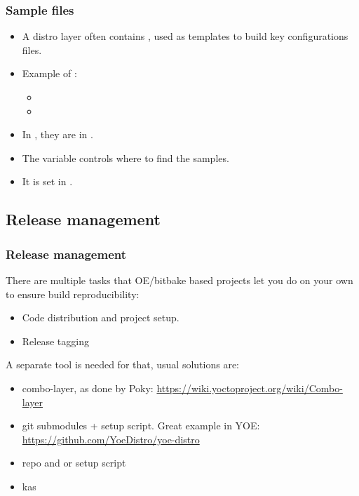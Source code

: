 \begin{frame}
  \frametitle{Sample files}
  \begin{itemize}
    \item A distro layer often contains , used as
      templates to build key configurations files.
    \item Example of :
      \begin{itemize}
        \item {}
        \item {}
      \end{itemize}
    \item In , they are in .
    \item The  variable controls where to find the
      samples.
    \item It is set in .
  \end{itemize}
\end{frame}

\subsection{Release management}

\begin{frame}[fragile]
  \frametitle{Release management}
  There are multiple tasks that OE/bitbake based projects let you do
  on your own to ensure build reproducibility:
  \begin{itemize}
  \item Code distribution and project setup.
  \item Release tagging
  \end{itemize}
  A separate tool is needed for that, usual solutions are:
  \begin{itemize}
  \item combo-layer, as done by Poky:
    \url{https://wiki.yoctoproject.org/wiki/Combo-layer}
  \item git submodules + setup script. Great example in YOE:
    \url{https://github.com/YoeDistro/yoe-distro}
  \item repo and  or setup script
  \item kas
  \end{itemize}
\end{frame}

